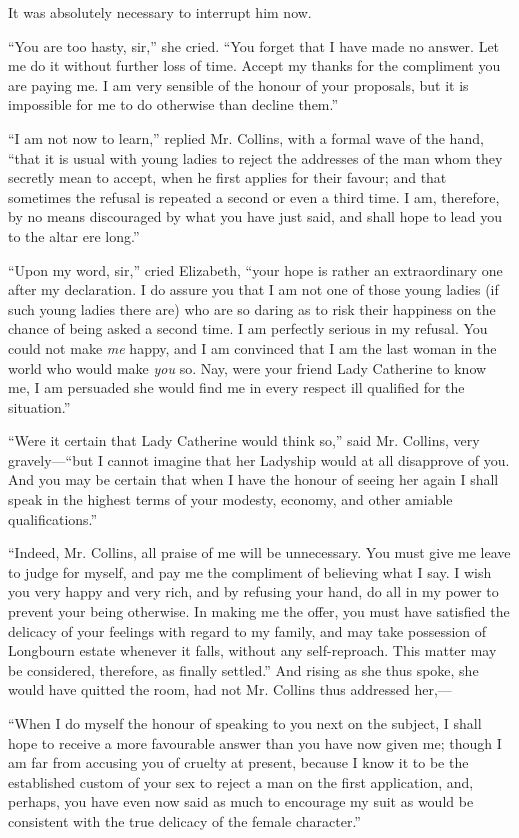 \documentclass[12pt]{book}
\begin{document}
It was absolutely necessary to interrupt him now.

``You are too hasty, sir,'' she cried. ``You forget that I have made no answer. Let me do it without further loss of time. Accept my thanks for the compliment you are paying me. I am very sensible of the honour of your proposals, but it is impossible for me to do otherwise than decline them.''

``I am not now to learn,'' replied Mr. Collins, with a formal wave of the hand, ``that it is usual with young ladies to reject the addresses of the man whom they secretly mean to accept, when he first applies for their favour; and that sometimes the refusal is repeated a second or even a third time. I am, therefore, by no means discouraged by what you have just said, and shall hope to lead you to the altar ere long.''

``Upon my word, sir,'' cried Elizabeth, ``your hope is rather an extraordinary one after my declaration. I do assure you that I am not one of those young ladies (if such young ladies there are) who are so daring as to risk their happiness on the chance of being asked a second time. I am perfectly serious in my refusal. You could not make \textit{me} happy, and I am convinced that I am the last woman in the world who would make \textit{you} so. Nay, were your friend Lady Catherine to know me, I am persuaded she would find me in every respect ill qualified for the situation.''

``Were it certain that Lady Catherine would think so,'' said Mr. Collins, very gravely---``but I cannot imagine that her Ladyship would at all disapprove of you. And you may be certain that when I have the honour of seeing her again I shall speak in the highest terms of your modesty, economy, and other amiable qualifications.''

``Indeed, Mr. Collins, all praise of me will be unnecessary. You must give me leave to judge for myself, and pay me the compliment of believing what I say. I wish you very happy and very rich, and by refusing your hand, do all in my power to prevent your being otherwise. In making me the offer, you must have satisfied the delicacy of your feelings with regard to my family, and may take possession of Longbourn estate whenever it falls, without any self-reproach. This matter may be considered, therefore, as finally settled.'' And rising as she thus spoke, she would have quitted the room, had not Mr. Collins thus addressed her,---

``When I do myself the honour of speaking to you next on the subject, I shall hope to receive a more favourable answer than you have now given me; though I am far from accusing you of cruelty at present, because I know it to be the established custom of your sex to reject a man on the first application, and, perhaps, you have even now said as much to encourage my suit as would be consistent with the true delicacy of the female character.''
\end{document}
